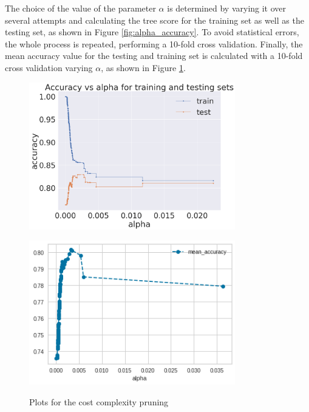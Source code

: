 \documentclass[a4paper,11pt,dvipsnames]{article}
\begin{document}
The choice of the value of the parameter $\alpha$ is determined by varying it over several attempts and calculating the tree score for the training set as well as the testing set, as shown in Figure \ref{fig:alpha_accuracy}. To avoid statistical errors, the whole process is repeated, performing a 10-fold cross validation. Finally, the mean accuracy value for the testing and training set is calculated with a 10-fold cross validation varying $\alpha$, as shown in Figure \ref{fig:mean_accuracy}.

\begin{figure}[h]
\begin{minipage}{0.5\linewidth}
        \centering
    \includegraphics[width=0.8\textwidth]{accuracy_vs_alpha.png}
    \label{fig:alpha_accuracy}
\end{minipage}
\hfill
    \begin{minipage}{0.5\linewidth}
        \centering
    \includegraphics[width=0.8\textwidth]{mean_accuracy.png}
    \label{fig:mean_accuracy}
\end{minipage}
    \caption{Plots for the cost complexity pruning}
\end{figure}
\end{document}
